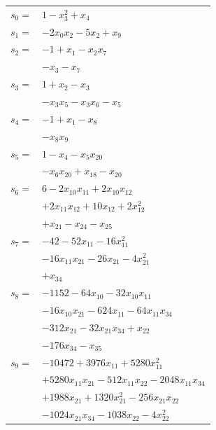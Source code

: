 \begingroup
\small
\setlength{\tabcolsep}{2pt}
\setlength{\LTleft}{0pt}
\begin{longtable}{@{}r@{\;}l@{}}
\(s_{0}=\) & \(\displaystyle 1 -x_{3}^{2} +x_{4}\) \\[3pt]
\(s_{1}=\) & \(\displaystyle -2x_{0}x_{2} -5x_{2} +x_{9}\) \\[3pt]
\(s_{2}=\) & \(\displaystyle -1 +x_{1} -x_{2}x_{7}\) \\
 & \(\displaystyle -x_{3} -x_{7}\) \\[3pt]
\(s_{3}=\) & \(\displaystyle 1 +x_{2} -x_{3}\) \\
 & \(\displaystyle -x_{3}x_{5} -x_{3}x_{6} -x_{5}\) \\[3pt]
\(s_{4}=\) & \(\displaystyle -1 +x_{1} -x_{8}\) \\
 & \(\displaystyle -x_{8}x_{9}\) \\[3pt]
\(s_{5}=\) & \(\displaystyle 1 -x_{4} -x_{5}x_{20}\) \\
 & \(\displaystyle -x_{6}x_{20} +x_{18} -x_{20}\) \\[3pt]
\(s_{6}=\) & \(\displaystyle 6 -2x_{10}x_{11} +2x_{10}x_{12}\) \\
 & \(\displaystyle +2x_{11}x_{12} +10x_{12} +2x_{12}^{2}\) \\
 & \(\displaystyle +x_{21} -x_{24} -x_{25}\) \\[3pt]
\(s_{7}=\) & \(\displaystyle -42 -52x_{11} -16x_{11}^{2}\) \\
 & \(\displaystyle -16x_{11}x_{21} -26x_{21} -4x_{21}^{2}\) \\
 & \(\displaystyle +x_{34}\) \\[3pt]
\(s_{8}=\) & \(\displaystyle -1152 -64x_{10} -32x_{10}x_{11}\) \\
 & \(\displaystyle -16x_{10}x_{21} -624x_{11} -64x_{11}x_{34}\) \\
 & \(\displaystyle -312x_{21} -32x_{21}x_{34} +x_{22}\) \\
 & \(\displaystyle -176x_{34} -x_{35}\) \\[3pt]
\(s_{9}=\) & \(\displaystyle -10472 +3976x_{11} +5280x_{11}^{2}\) \\
 & \(\displaystyle +5280x_{11}x_{21} -512x_{11}x_{22} -2048x_{11}x_{34}\) \\
 & \(\displaystyle +1988x_{21} +1320x_{21}^{2} -256x_{21}x_{22}\) \\
 & \(\displaystyle -1024x_{21}x_{34} -1038x_{22} -4x_{22}^{2}\) \\

\end{longtable}
